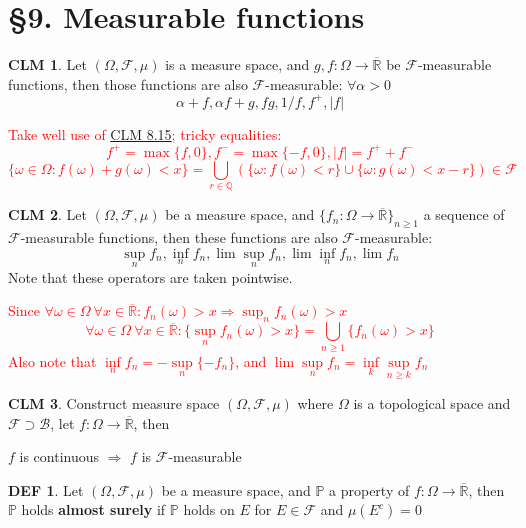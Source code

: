 \documentclass[hidelinks]{article}
\theoremstyle{definition}
\newtheorem*{defin}{DEF}
\theoremstyle{dotless}
\newtheorem{claim}{CLM}[section]
\theoremstyle{remark}
\begin{document}
\bigbreak

\section*{\S9. Measurable functions}
\setcounter{section}{9}

\begin{claim}
Let $(\Omega,\mathscr{F},\mu)$ is a measure space, and $g,f:\Omega\to\overline{\mathbb{R}}$ be $\mathscr{F}$-measurable functions, then those functions are also $\mathscr{F}$-measurable: $\forall\alpha>0$
\[\alpha+f,\alpha f+g,fg,1/f,f^+,|f|\]
\end{claim}
\textcolor{red}{Take well use of \hyperref[CLM 8.15]{CLM 8.15}; tricky equalities:
\[f^+=\max\{f,0\},f^-=\max\{-f,0\},|f|=f^++f^-\]
\[\{\omega\in\Omega:f(\omega)+g(\omega)<x\}=\bigcup_{r\in\mathbb{Q}}(\{\omega:f(\omega)<r\}\cup\{\omega:g(\omega)<x-r\})\in\mathscr{F}\]}

\begin{claim}
Let $(\Omega,\mathscr{F},\mu)$ be a measure space, and $\{f_n:\Omega\to\overline{\mathbb{R}}\}_{n\geq1}$ a sequence of $\mathscr{F}$-measurable functions, then these functions are also $\mathscr{F}$-measurable:
\[\sup_nf_n,\inf_nf_n,\lim\sup_nf_n,\lim\inf_nf_n,\lim f_n\]
Note that these operators are taken pointwise.
\end{claim}
\textcolor{red}{Since $\forall\omega\in\Omega\ \forall x\in\overline{\mathbb{R}}:f_n(\omega)>x\Rightarrow\sup_nf_n(\omega)>x$
\[\forall\omega\in\Omega\ \forall x\in\overline{\mathbb{R}}:\{\sup_nf_n(\omega)>x\}=\bigcup_{n\geq1}\{f_n(\omega)>x\}\]
Also note that $\inf\limits_nf_n=-\sup\limits_n\{-f_n\}$, and $\lim\sup\limits_nf_n=\inf\limits_k\sup\limits_{n\geq k}f_n$}

\begin{claim}
Construct measure space $(\Omega,\mathscr{F},\mu)$ where $\Omega$ is a topological space and $\mathscr{F}\supset\mathscr{B}$, let $f:\Omega\to\overline{\mathbb{R}}$, then
\begin{center}$f$ is continuous $\Rightarrow$ $f$ is $\mathscr{F}$-measurable\end{center}
\end{claim}

\begin{defin}
Let $(\Omega,\mathscr{F},\mu)$ be a measure space, and $\mathbb{P}$ a property of $f:\Omega\to\overline{\mathbb{R}}$, then $\mathbb{P}$ holds \textbf{almost surely} if $\mathbb{P}$ holds on $E$ for $E\in\mathscr{F}$ and $\mu(E^c)=0$
\end{defin}
\end{document}
